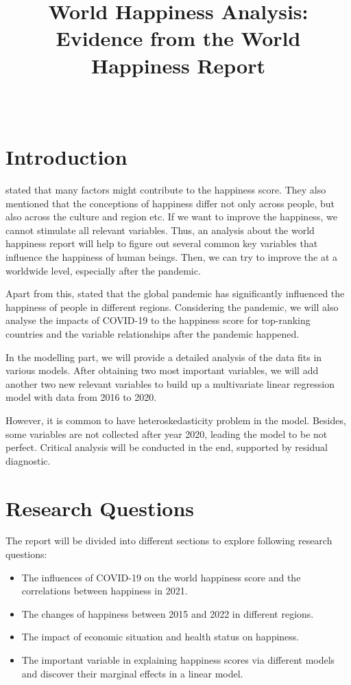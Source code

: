 \documentclass[11pt,a4paper,]{article}
\title{World Happiness Analysis: Evidence from the World Happiness Report}
\author{\sf{\Large\textbf{(Elvis) Zhixiang Yang}\\\large EBS Honours Student\\[0.5cm]}{\Large\textbf{Yiqi Wang}\\\large Master of BA Student\\[0.5cm]}{\Large\textbf{Xintong You}\\\large Master of BA Student\\[0.5cm]}}
\date{\sf\Date~\Month~\Year}
\makeatletter
\def\titlepage{\front{\expandafter{\@title}}{\@author}{\@organization}}
\makeatother
\begin{document}
\titlepage

{
\setcounter{tocdepth}{2}
\tableofcontents
}
\clearpage

\hypertarget{introduction}{%
\section{Introduction}\label{introduction}}

\textcite{rojas2010} stated that many factors might contribute to the happiness score. They also mentioned that the conceptions of happiness differ not only across people, but also across the culture and region etc. If we want to improve the happiness, we cannot stimulate all relevant variables. Thus, an analysis about the world happiness report will help to figure out several common key variables that influence the happiness of human beings. Then, we can try to improve the at a worldwide level, especially after the pandemic.

Apart from this, \textcite{helliwell2021world} stated that the global pandemic has significantly influenced the happiness of people in different regions. Considering the pandemic, we will also analyse the impacts of COVID-19 to the happiness score for top-ranking countries and the variable relationships after the pandemic happened.

In the modelling part, we will provide a detailed analysis of the data fits in various models. After obtaining two most important variables, we will add another two new relevant variables to build up a multivariate linear regression model with data from 2016 to 2020.

However, it is common to have heteroskedasticity problem in the model. Besides, some variables are not collected after year 2020, leading the model to be not perfect. Critical analysis will be conducted in the end, supported by residual diagnostic.

\hypertarget{research-questions}{%
\section{Research Questions}\label{research-questions}}

The report will be divided into different sections to explore following research questions:

\begin{itemize}
\item
  The influences of COVID-19 on the world happiness score and the correlations between happiness in 2021.
\item
  The changes of happiness between 2015 and 2022 in different regions.
\item
  The impact of economic situation and health status on happiness.
\item
  The important variable in explaining happiness scores via different models and discover their marginal effects in a linear model.
\end{itemize}
\end{document}
